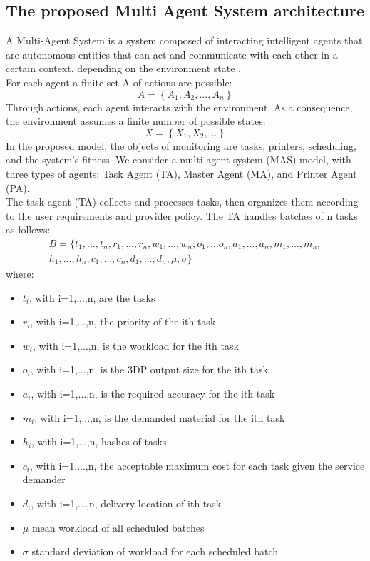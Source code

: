 \subsection{The proposed Multi Agent System architecture}
A Multi-Agent System is a system composed of interacting intelligent agents that are autonomous entities that can act and communicate with each other in a certain context, depending on the environment state \parencite{lopes_negotiation_2009}.\\
For each agent a finite set A of actions are possible: \begin{equation} \label{eq:7} A = \left\{A_1,A_2,...,A_n\right\}\end{equation}
Through actions, each agent interacts with the environment. As a consequence, the environment assumes a finite number of possible states: \begin{equation} \label{eq:8} X = \left\{X_1, X_2, ...\right\} \end{equation}
In the proposed model, the objects of monitoring are tasks, printers, scheduling, and the system's fitness. We consider a multi-agent system (MAS) model, with three types of agents: Task Agent (TA), Master Agent (MA), and Printer Agent (PA).\\
The task agent (TA) collects and processes tasks, then organizes them according to the user requirements and provider policy. The TA handles batches of n tasks as follows:
\begin{multline}
    \label{eq:9}
    B=\{t_1,...,t_n,r_1,...,r_n,w_1,...,w_n,o_1,...o_n,a_1,...,a_n,m_1,...,m_n,\\ 
        h_1,...,h_n,c_1,...,c_n,d_1,...,d_n,\mu,\sigma\}
\end{multline}
where:
\begin{itemize}
    \item $t_i$, with i=1,...,n, are the tasks
    \item $r_i$, with i=1,...,n, the priority of the ith task
    \item $w_i$, with i=1,...,n, is the workload for the ith task
    \item $o_i$, with i=1,...,n, is the 3DP output size for the ith task
    \item $a_i$, with i=1,...,n, is the required accuracy for the ith task
    \item $m_i$, with i=1,...,n, is the demanded material for the ith task
    \item $h_i$, with i=1,...,n, hashes of tasks
    \item $c_i$, with i=1,...,n, the acceptable maximum cost for each task given the service demander
    \item $d_i$, with i=1,...,n, delivery location of ith task
    \item $\mu$ mean workload of all scheduled batches
    \item $\sigma$ standard deviation of workload for each scheduled batch
\end{itemize}

